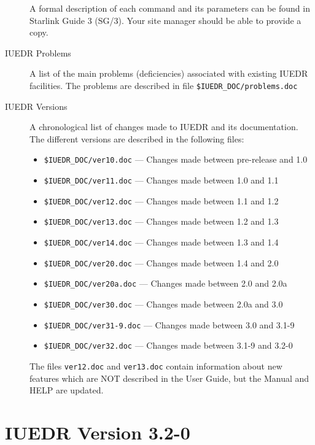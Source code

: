 \begin {description}

\item []
A formal description of each command and its parameters can be found in
Starlink Guide 3 (SG/3).
Your site manager should be able to provide a copy.

\item [IUEDR Problems]
A list of the main problems (deficiencies) associated with existing IUEDR
facilities.
The problems are described in file {\tt \$IUEDR\_DOC/problems.doc}

\item [IUEDR Versions]
A chronological list of changes made to IUEDR and its documentation.
The different versions are described in the following files:

\begin {itemize}
\item {\tt \$IUEDR\_DOC/ver10.doc} --- Changes made between pre-release and 1.0
\item {\tt \$IUEDR\_DOC/ver11.doc} --- Changes made between 1.0 and 1.1
\item {\tt \$IUEDR\_DOC/ver12.doc} --- Changes made between 1.1 and 1.2
\item {\tt \$IUEDR\_DOC/ver13.doc} --- Changes made between 1.2 and 1.3
\item {\tt \$IUEDR\_DOC/ver14.doc} --- Changes made between 1.3 and 1.4
\item {\tt \$IUEDR\_DOC/ver20.doc} --- Changes made between 1.4 and 2.0
\item {\tt \$IUEDR\_DOC/ver20a.doc} --- Changes made between 2.0 and 2.0a
\item {\tt \$IUEDR\_DOC/ver30.doc} --- Changes made between 2.0a and 3.0
\item {\tt \$IUEDR\_DOC/ver31-9.doc} --- Changes made between 3.0 and 3.1-9
\item {\tt \$IUEDR\_DOC/ver32.doc} --- Changes made between 3.1-9 and 3.2-0
\end {itemize}

The files {\tt ver12.doc} and {\tt ver13.doc} contain information about new
features which are NOT described in the User Guide, but the Manual
and HELP are updated.

\end {description}

\section {\label{se:v3.2-0}IUEDR Version 3.2-0}

